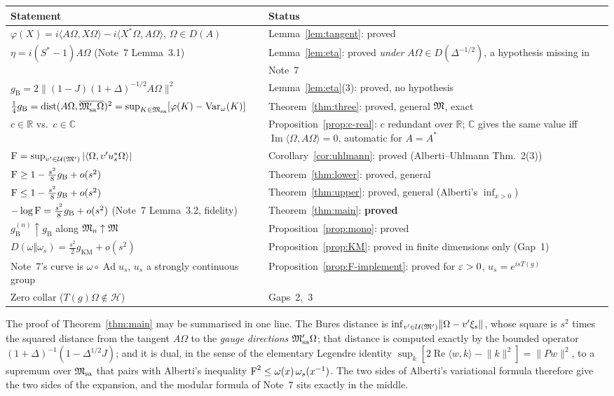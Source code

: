 \documentclass[11pt]{article}
\newcommand{\Om}{\Omega}
\newcommand{\Hil}{\mathcal H}
\newcommand{\Msa}{\cM_{\mathrm{sa}}}
\newcommand{\Mpsa}{\cM'_{\mathrm{sa}}}
\newcommand{\Var}{\operatorname{Var}}
\newcommand{\dist}{\operatorname{dist}}
\newcommand{\gB}{g_{\mathrm B}}
\newcommand{\gKM}{g_{\mathrm{KM}}}
\newcommand{\ip}[2]{\langle #1,#2\rangle}
\newcommand{\norm}[1]{\lVert #1\rVert}
\newcommand{\U}{\mathcal U}
\newcommand{\Ad}{\operatorname{Ad}}\newcommand{\ket}[1]{|#1\rangle}\newcommand{\bra}[1]{\langle#1|}
\begin{document}
\begin{center}\small
\begin{tabular}{@{}p{}p{}@{}}\toprule
\textbf{Statement} & \textbf{Status}\\\midrule
$\varphi(X)=i\ip{A\Om}{X\Om}-i\ip{X^*\Om}{A\Om}$, $\Om\in D(A)$ & Lemma~\ref{lem:tangent}: proved\\
$\eta=i(S^*-1)A\Om$ (Note~7 Lemma~3.1) & Lemma~\ref{lem:eta}: proved \emph{under} $A\Om\in D(\Delta^{-1/2})$, a
hypothesis missing in Note~7\\
$\gB=2\norm{(1-J)(1+\Delta)^{-1/2}A\Om}^2$ & Lemma~\ref{lem:eta}(3): proved, no hypothesis\\
$\tfrac14\gB=\dist(A\Om,\overline{\Mpsa\Om})^2=\sup_{K\in\Msa}[\varphi(K)-\Var_\omega(K)]$ &
Theorem~\ref{thm:three}: proved, general $\mathfrak M$, exact\\
$c\in\mathbb R$ vs.\ $c\in\mathbb C$ & Proposition~\ref{prop:c-real}: $c$ redundant over $\mathbb R$; $\mathbb C$ gives
the same value iff $\operatorname{Im}\ip\Om{A\Om}=0$, automatic for $A=A^*$\\
$\Fid=\sup_{v'\in\U(\cM')}|\ip{\Om}{v'u_s^*\Om}|$ & Corollary~\ref{cor:uhlmann}: proved (Alberti--Uhlmann Thm.~2(3))\\
$\Fid\ge1-\frac{s^2}8\gB+o(s^2)$ & Theorem~\ref{thm:lower}: proved, general\\
$\Fid\le1-\frac{s^2}8\gB+o(s^2)$ & Theorem~\ref{thm:upper}: proved, general (Alberti's $\inf_{x>0}$)\\
$-\log\Fid=\frac{s^2}8\gB+o(s^2)$ (Note~7 Lemma~3.2, fidelity) & Theorem~\ref{thm:main}: \textbf{proved}\\
$\gB^{(n)}\uparrow\gB$ along $\mathfrak M_n\uparrow\mathfrak M$ & Proposition~\ref{prop:mono}: proved\\
$D(\omega\Vert\omega_s)=\frac{s^2}2\gKM+o(s^2)$ & Proposition~\ref{prop:KM}: proved in finite dimensions only
(Gap~1)\\
Note~7's curve is $\omega\circ\Ad u_s$, $u_s$ a strongly continuous group & Proposition~\ref{prop:F-implement}:
proved for $\varepsilon>0$, $u_s=e^{isT(g)}$\\
Zero collar ($T(g)\Om\notin\Hil$) & Gaps~2,~3\\\bottomrule
\end{tabular}
\end{center}

The proof of Theorem~\ref{thm:main} may be summarised in one line.  The Bures distance is
$\inf_{v'\in\U(\cM')}\norm{\Om-v'\xi_s}$, whose square is $s^2$ times the squared distance from the tangent
$A\Om$ to the \emph{gauge directions} $\Mpsa\Om$; that distance is computed exactly by the bounded operator
$(1+\Delta)^{-1}(1-\Delta^{1/2}J)$; and it is dual, in the sense of the elementary Legendre identity
$\sup_k[2\operatorname{Re}\ip wk-\norm k^2]=\norm{P w}^2$, to a supremum over $\Msa$ that pairs with Alberti's
inequality $\operatorname{F}^2\le\omega(x)\,\omega_s(x^{-1})$.  The two sides of Alberti's variational formula therefore give the
two sides of the expansion, and the modular formula of Note~7 sits exactly in the middle.
\end{document}
